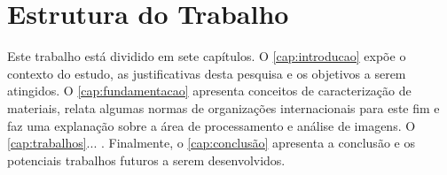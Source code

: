 \section{Estrutura do Trabalho}

Este trabalho está dividido em sete capítulos.  O \autoref{cap:introducao} expõe o contexto do estudo, as justificativas desta pesquisa e os objetivos a serem atingidos. O \autoref{cap:fundamentacao} apresenta conceitos de caracterização de materiais, relata algumas normas de organizações internacionais para este fim e faz uma explanação sobre a área de processamento e análise de imagens. O \autoref{cap:trabalhos}... . Finalmente, o \autoref{cap:conclusão} apresenta a conclusão e os potenciais trabalhos futuros a serem desenvolvidos.
